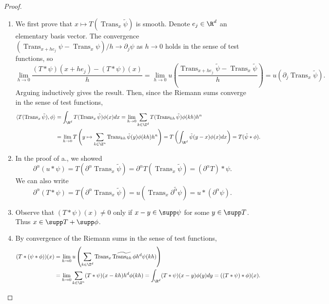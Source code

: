 \documentclass[reqno]{amsart}
\theoremstyle{definition}
\theoremstyle{remark}
\begin{document}
\begin{proof}
\leavevmode
\begin{enumerate}
	\item We first prove that $x \mapsto T( \operatorname{Trans}_x \tilde \psi)$ is smooth. Denote $e_j \in \R^d$ an elementary basis vector. The convergence $(\operatorname{Trans}_{x + he_j} \psi - \operatorname{Trans}_{x} \psi)/h \to \partial_j \psi$ as $h \to 0$ holds in the sense of test functions, so 
	\[\lim_{h \to 0} \frac{(T * \psi)(x + h e_j) - (T * \psi)(x)}{h} =\lim_{h \to 0} u \left( \frac{\operatorname{Trans}_{x + he_j} \tilde \psi - \operatorname{Trans}_x \tilde \psi}{h} \right) = u(\partial_j \operatorname{Trans}_x \tilde\psi) .\]
Arguing inductively gives the result. Then, since the Riemann sums converge in the sense of test functions, 
					\begin{align*}
						 \langle T(\operatorname{Trans}_x \tilde \psi), \phi \rangle 
						 	&= \int_{\R^d}  T(\operatorname{Trans}_x \tilde \psi) \phi(x) dx = \lim_{h \to 0} \sum_{k \in \Z^d} T(\operatorname{Trans}_{kh} \tilde \psi) \phi(kh) h^n \\
						 	&= \lim_{h \to 0} T \left( y \mapsto \sum_{k \in \Z^n} \operatorname{Trans}_{kh} \tilde \psi (y) \phi(kh) h^n \right) = T \left( \int_{\R^d} \tilde \psi(y - x) \phi(x) dx \right) = T(\tilde \psi * \phi).
						\end{align*} 	

	\item In the proof of a., we showed
					\[ \partial^\alpha (u * \psi) = T (\partial^\alpha \operatorname{Trans}_x \tilde \psi) = \partial^\alpha T (\operatorname{Trans}_x \tilde \psi) = (\partial^\alpha T) * \psi.\]
				We can also write
					\[ \partial^\alpha (T * \psi) =T (\partial^\alpha \operatorname{Trans}_x \tilde \psi) = u(\operatorname{Trans}_x \widetilde{\partial^\alpha \psi}) =  u * (\partial^\alpha \psi). \]
	\item Observe that $(T * \psi)(x) \neq 0$ only if $x - y \in \supp \psi$ for some $y \in \supp T$. Thus $x \in \supp T + \supp \phi$.
	\item By convergence of the Riemann sums in the sense of test functions, 
				\begin{align*}
					 (T * (\psi * \phi))(x) 
					 	&= \lim_{h \to 0} u \left( \sum_{k \in \Z^d} \operatorname{Trans}_x\widetilde{\operatorname{Trans}_{kh}\phi} h^d \psi(kh) \right) \\
					 	&= \lim_{h \to 0} \sum_{k \in \Z^n} (T * \psi) (x - kh) h^d \phi(kh) = \int_{\R^d} (T * \psi)(x - y) \phi(y) dy = ((T * \psi) * \phi)(x) .
				\end{align*}	 
\end{enumerate} 
\end{proof}
\end{document}

